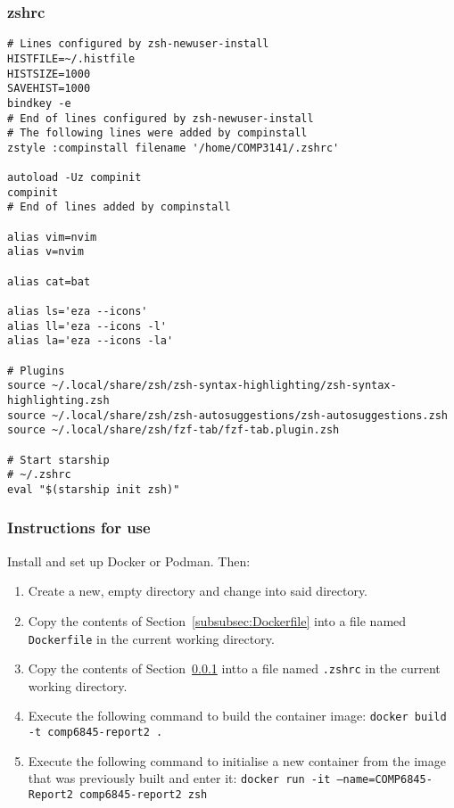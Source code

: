 \subsubsection{zshrc}
\label{subsubsec:zshrc}

\begin{verbatim}
# Lines configured by zsh-newuser-install
HISTFILE=~/.histfile
HISTSIZE=1000
SAVEHIST=1000
bindkey -e
# End of lines configured by zsh-newuser-install
# The following lines were added by compinstall
zstyle :compinstall filename '/home/COMP3141/.zshrc'

autoload -Uz compinit
compinit
# End of lines added by compinstall

alias vim=nvim
alias v=nvim

alias cat=bat

alias ls='eza --icons'
alias ll='eza --icons -l'
alias la='eza --icons -la'

# Plugins
source ~/.local/share/zsh/zsh-syntax-highlighting/zsh-syntax-highlighting.zsh
source ~/.local/share/zsh/zsh-autosuggestions/zsh-autosuggestions.zsh
source ~/.local/share/zsh/fzf-tab/fzf-tab.plugin.zsh

# Start starship
# ~/.zshrc
eval "$(starship init zsh)"
\end{verbatim}

\subsubsection{Instructions for use}

Install and set up Docker or Podman. Then:

\begin{enumerate}
    \item Create a new, empty directory and change into said directory.
    \item Copy the contents of Section~\ref{subsubsec:Dockerfile} into a file named \texttt{Dockerfile} in the current working directory.
    \item Copy the contents of Section~\ref{subsubsec:zshrc} intto a file named \texttt{.zshrc} in the current working directory.
    \item Execute the following command to build the container image: \texttt{docker build -t comp6845-report2 .}
    \item Execute the following command to initialise a new container from the image that was previously built and enter it: \texttt{docker run -it --name=COMP6845-Report2 comp6845-report2 zsh}
\end{enumerate}

